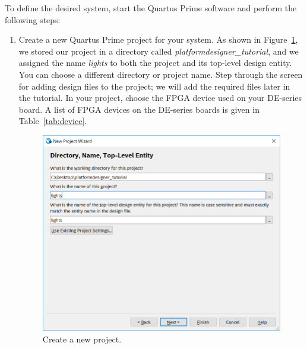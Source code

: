 \documentclass[11pt, twoside, pdftex]{article}
\begin{document}
\noindent To define the desired system, start the Quartus Prime software and perform
the following steps: 
\begin{enumerate}
\item Create a new Quartus Prime project for your system. As shown in Figure~\ref{fig:3}, we stored 
our project in a directory called {\it platformdesigner\_tutorial}, and we
assigned the name {\it lights} to both the project and its top-level design entity.
You can choose a different directory or project name.
Step through the screen for adding design files to the project;
we will add the required files later in the tutorial.
In your project, choose the FPGA device used on your DE-series board. 
A list of FPGA devices on the DE-series boards is given in Table~\ref{tab:device}. 

\begin{figure}[H]
			\begin{center}
      \includegraphics[scale=0.6]{figures/figure3.png}
     	\end{center}
   	\caption{Create a new project.} 
	\label{fig:3}
	\end{figure}


\end{enumerate}
\end{document}
